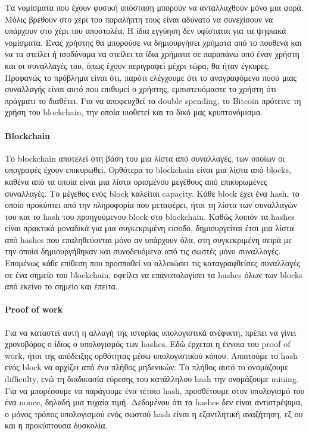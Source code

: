\documentclass[titlepage]{article}
\begin{document}
Τα νομίσματα που έχουν φυσική υπόσταση μπορούν να ανταλλαχθούν μόνο μια φορά. Μόλις βρεθούν στο χέρι του παραλήπτη τους είναι αδύνατο να συνεχίσουν να υπάρχουν στο χέρι του αποστολέα. Η ίδια εγγύηση δεν υφίσταται για τα ψηφιακά νομίσματα. Ένας χρήστης θα μπορούσε να δημιουργήσει χρήματα από το πουθενά και να τα στείλει ή ισοδύναμα να στείλει τα ίδια χρήματα σε παραπάνω από έναν χρήστη και οι συναλλαγές του, όπως έχουν περιγραφεί μέχρι τώρα, θα ήταν έγκυρες. Προφανώς το πρόβλημα είναι ότι, παρότι ελέγχουμε ότι το αναγραφόμενο ποσό μιας συναλλαγής είναι αυτό που επιθυμεί ο χρήστης, εμπιστευόμαστε το χρήστη ότι πράγματι το διαθέτει. Για να αποφευχθεί το double spending, το Bitcoin πρότεινε τη χρήση του blockchain, την οποία υιοθετεί και το δικό μας κρυπτονόμισμα.

\paragraph{Blockchain}

Το blockchain αποτελεί στη βάση του μια λίστα από συναλλαγές, των οποίων οι υπογραφές έχουν επικυρωθεί. Ορθότερα το blockchain είναι μια λίστα από blocks, καθένα από τα οποία είναι μια λίστα ορισμένου μεγέθους από επικυρωμένες συναλλαγές. Το μέγεθος ενός block καλείται capacity. Κάθε block έχει ένα hash, το οποίο προκύπτει από την πληροφορία που μεταφέρει, ήτοι τη λίστα των συναλλαγών του και το hash του προηγούμενου block στο blockchain. Καθώς λοιπόν τα hashes είναι πρακτικά μοναδικά για μια συγκεκριμένη είσοδο, δημιουργείται έτσι μια λίστα από hashes που επαληθεύονται μόνο αν υπάρχουν όλα, στη συγκεκριμένη σειρά με την οποία δημιουργήθηκαν και συνοδευόμενα από τις σωστές μόνο συναλλαγές. Επομένως κάθε επίθεση που προσπαθεί να αλλοιώσει τις καταγραφθείσες συναλλαγές σε ένα σημείο του blockchain, οφείλει να επανυπολογίσει τα hashes όλων των blocks από εκείνο το σημείο και έπειτα.

\paragraph{Proof of work}

Για να καταστεί αυτή η αλλαγή της ιστορίας υπολογιστικά ανέφικτη, πρέπει να γίνει χρονοβόρος ο ίδιος ο υπολογισμός των hashes. Εδώ έρχεται η έννοια του proof of work, ήτοι της απόδειξης ορθότητας μέσω υπολογιστικού κόπου. Απαιτούμε το hash ενός block να αρχίζει από ένα πλήθος μηδενικών. Το πλήθος αυτό το ονομάζουμε difficulty, ενώ τη διαδικασία εύρεσης του κατάλληλου hash την ονομάζουμε mining. Για να μπορέσουμε να παράγουμε ένα τέτοιο hash, προσθέτουμε στον υπολογισμό του ένα nonce, δηλαδή μια τυχαία τιμή. Δεδομένου ότι τα hashes δεν είναι αντιστρέψιμα, ο μόνος τρόπος υπολογισμού ενός σωστού hash είναι η εξαντλητική αναζήτηση, εξ ου και η προκύπτουσα δυσκολία.
\end{document}
